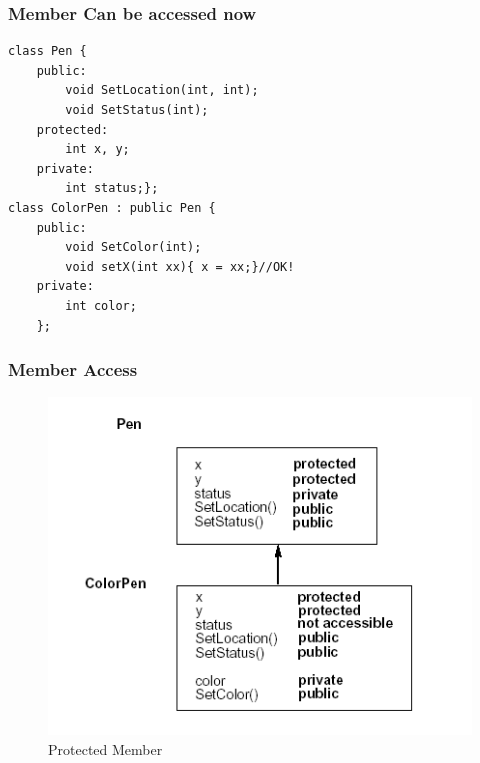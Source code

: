 \documentclass{beamer}
\newtheorem{Key points}{Key points}
\begin{document}
\begin{frame}[fragile]
\frametitle{Member Can be accessed now}
\begin{lstlisting}
class Pen {
	public:
		void SetLocation(int, int);
		void SetStatus(int);
	protected:
		int x, y;
	private:
		int status;};
class ColorPen : public Pen {
	public:
		void SetColor(int);
		void setX(int xx){ x = xx;}//OK!	
	private:
		int color;
	};
\end{lstlisting}
\end{frame}
\begin{frame}[fragile]
\frametitle{Member Access}
  \begin{figure}
    \centering
\includegraphics[width=0.8\columnwidth]{protect.png}    
\caption{Protected Member}
  \end{figure}
\end{frame}
\end{document}

